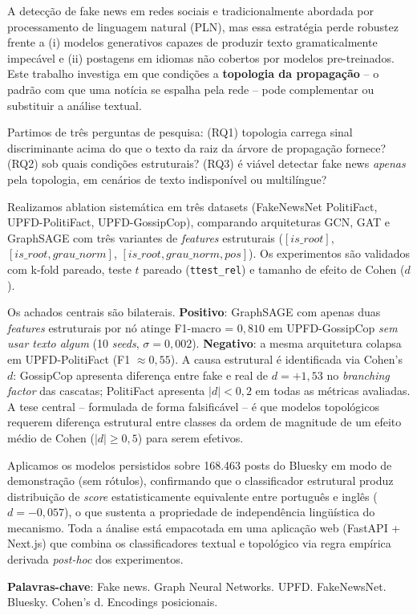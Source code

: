\documentclass[12pt,oneside,a4paper]{abntex2}
\begin{document}
\imprimircapa
\imprimirfolhaderosto


\begin{resumo}
A detec\c{c}\~ao de fake news em redes sociais e tradicionalmente abordada por
processamento de linguagem natural (PLN), mas essa estrat\'egia perde
robustez frente a (i) modelos generativos capazes de produzir texto
gramaticalmente impec\'avel e (ii) postagens em idiomas n\~ao cobertos por
modelos pre-treinados. Este trabalho investiga em que condi\c{c}\~oes a
\textbf{topologia da propaga\c{c}\~ao} -- o padr\~ao com que uma not\'icia se
espalha pela rede -- pode complementar ou substituir a an\'alise textual.

Partimos de tr\^es perguntas de pesquisa: (RQ1) topologia carrega sinal
discriminante acima do que o texto da raiz da \'arvore de propaga\c{c}\~ao
fornece? (RQ2) sob quais condi\c{c}\~oes estruturais? (RQ3) \'e vi\'avel
detectar fake news \emph{apenas} pela topologia, em cen\'arios de texto
indispon\'ivel ou multil\'ingue?

Realizamos ablation sistem\'atica em tr\^es datasets (FakeNewsNet PolitiFact,
UPFD-PolitiFact, UPFD-GossipCop), comparando arquiteturas GCN, GAT e
GraphSAGE com tr\^es variantes de \emph{features} estruturais
($[is\_root]$, $[is\_root, grau\_norm]$, $[is\_root, grau\_norm, pos]$).
Os experimentos s\~ao validados com k-fold pareado, teste $t$ pareado
(\texttt{ttest\_rel}) e tamanho de efeito de Cohen ($d$).

Os achados centrais s\~ao bilaterais. \textbf{Positivo}: GraphSAGE com apenas
duas \emph{features} estruturais por n\'o atinge F1-macro = $0{,}810$ em
UPFD-GossipCop \emph{sem usar texto algum} (10 \emph{seeds}, $\sigma = 0{,}002$).
\textbf{Negativo}: a mesma arquitetura colapsa em UPFD-PolitiFact
(F1 $\approx 0{,}55$). A causa estrutural \'e identificada via Cohen's $d$:
GossipCop apresenta diferen\c{c}a entre fake e real de $d = +1{,}53$ no
\emph{branching factor} das cascatas; PolitiFact apresenta $|d| < 0{,}2$
em todas as m\'etricas avaliadas. A tese central -- formulada de forma
falsific\'avel -- \'e que modelos topol\'ogicos requerem diferen\c{c}a
estrutural entre classes da ordem de magnitude de um efeito m\'edio de
Cohen ($|d| \geq 0{,}5$) para serem efetivos.

Aplicamos os modelos persistidos sobre 168.463 posts do Bluesky em modo de
demonstra\c{c}\~ao (sem r\'otulos), confirmando que o classificador
estrutural produz distribui\c{c}\~ao de \emph{score} estatisticamente
equivalente entre portugu\^es e ingl\^es ($d = -0{,}057$), o que sustenta
a propriedade de independ\^encia lingü\'istica do mecanismo. Toda a
\'analise est\'a empacotada em uma aplica\c{c}\~ao web (FastAPI + Next.js)
que combina os classificadores textual e topol\'ogico via regra emp\'irica
derivada \emph{post-hoc} dos experimentos.

\textbf{Palavras-chave}: Fake news. Graph Neural Networks. UPFD. FakeNewsNet.
Bluesky. Cohen's d. Encodings posicionais.
\end{resumo}
\end{document}
